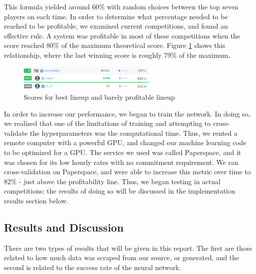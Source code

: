 This formula yielded around 60\% with random choices between the top seven players on each time. In order to determine what percentage needed to be reached to be profitable, we examined current competitions, and found an effective rule. A system was profitable in most of these competitions when the score reached 80\% of the maximum theoretical score. Figure \ref{fig:80pRule} shows this relationship, where the last winning score is roughly 79\% of the maximum.\\
\begin{figure}[ht]
    \centering
    \includegraphics[width=0.6\textwidth]{figures/winningvslosing}
    \caption{Scores for best lineup and barely profitable lineup}
    \label{fig:80pRule}
\end{figure}
In order to increase our performance, we began to train the network. In doing so, we realized that one of the limitations of training and attempting to cross-validate the hyperparameters was the computational time. Thus, we rented a remote computer with a powerful GPU, and changed our machine learning code to be optimized for a GPU. The service we used was called Paperspace, and it was chosen for its low hourly rates with no commitment requirement. We ran cross-validation on Paperspace, and were able to increase this metric over time to 82\% - just above the profitability line. Thus, we began testing in actual competitions; the results of doing so will be discussed in the implementation results section below.

\subsection{Results and Discussion}
There are two types of results that will be given in this report. The first are those related to how much data was scraped from our source, or generated, and the second is related to the success rate of the neural network.

